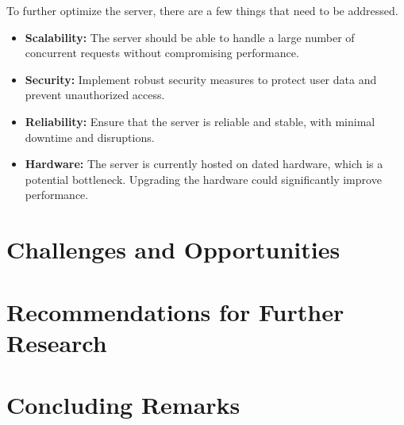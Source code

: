 To further optimize the server, there are a few things that need to be addressed.

\begin{itemize}
    \item \textbf{Scalability:} The server should be able to handle a large number of concurrent requests without compromising performance.
    \item \textbf{Security:} Implement robust security measures to protect user data and prevent unauthorized access.
    \item \textbf{Reliability:} Ensure that the server is reliable and stable, with minimal downtime and disruptions.
    \item \textbf{Hardware:} The server is currently hosted on dated hardware, which is a potential bottleneck. Upgrading the hardware could significantly improve performance.
\end{itemize}

\section{}

\section{Challenges and Opportunities}

\section{Recommendations for Further Research}

\section{Concluding Remarks}
